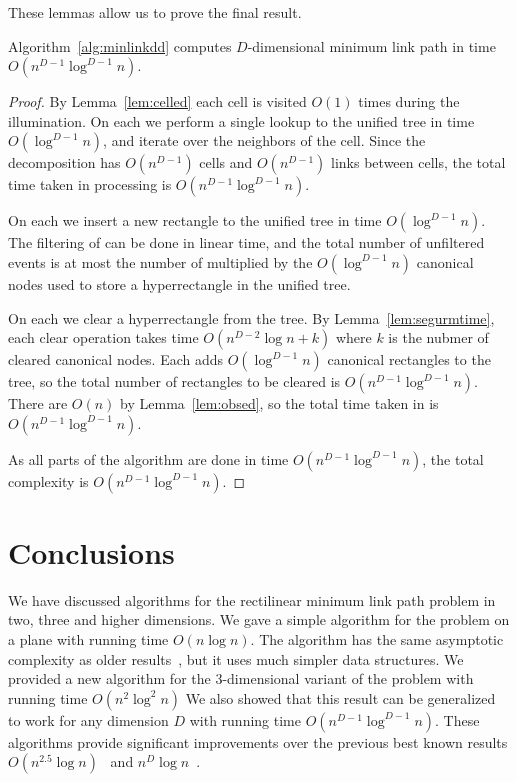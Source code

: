 \documentclass[english,gradu]{tktltiki2018}
\begin{document}
These lemmas allow us to prove the final result.

\begin{theo}Algorithm~\ref{alg:minlinkdd} computes $D$-dimensional minimum link path in time $O(n^{D-1}\log^{D-1}n)$.\end{theo}
\begin{proof}
By Lemma~\ref{lem:celled} each cell is visited $O(1)$ times during the illumination.
On each \cellE we perform a single lookup to the unified tree in time $O(\log^{D-1} n)$, and iterate over the neighbors of the cell.
Since the decomposition has $O(n^{D-1})$ cells and $O(n^{D-1})$ links between cells, the total time taken in processing \cellEs is $O(n^{D-1}\log^{D-1} n)$.

On each \addE we insert a new rectangle to the unified tree in time $O(\log^{D-1} n)$.
The filtering of \addEs can be done in linear time, and the total number of unfiltered events is at most the number of \addEs multiplied by the $O(\log^{D-1} n)$ canonical nodes used to store a hyperrectangle in the unified tree.

On each \obsE we clear a hyperrectangle from the tree.
By Lemma~\ref{lem:segurmtime}, each clear operation takes time $O(n^{D-2}\log n + k)$ where $k$ is the nubmer of cleared canonical nodes.
Each \addE adds $O(\log^{D-1} n)$ canonical rectangles to the tree, so the total number of rectangles to be cleared is $O(n^{D-1}\log^{D-1} n)$.
There are $O(n)$ \obsEs by Lemma~\ref{lem:obsed}, so the total time taken in \obsEs is $O(n^{D-1}\log^{D-1} n)$.

As all parts of the algorithm are done in time $O(n^{D-1}\log^{D-1} n)$, the total complexity is $O(n^{D-1}\log^{D-1} n)$.
\end{proof}



\section{Conclusions}\label{sec:conclusions}

We have discussed algorithms for the rectilinear minimum link path problem in two, three and higher dimensions.
We gave a simple algorithm for the problem on a plane with running time $O(n\log n)$.
The algorithm has the same asymptotic complexity as older results~\cite{dasnar,sato}, but it uses much simpler data structures.
We provided a new algorithm for the 3-dimensional variant of the problem with running time $O(n^2\log^2 n)$
We also showed that this result can be generalized to work for any dimension $D$ with running time $O(n^{D-1}\log^{D-1}n)$.
These algorithms provide significant improvements over the previous best known results $O(n^{2.5}\log n)$~\cite{wagner} and $n^D\log n$~\cite{de1992}.
\end{document}
